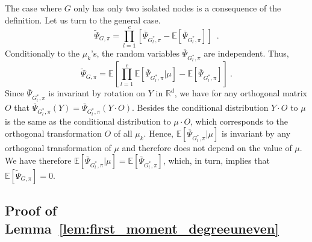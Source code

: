 \documentclass{article}
\begin{document}
    The case where $G$ only has only two isolated nodes is a consequence of the definition. Let us turn to the general case. 
    \[
    \widetilde{\Psi}_{G,\pi}= \prod_{l=1}^c \left[\overline{\Psi}_{G^*_l,\pi} - \mathbb{E}[\overline{\Psi}_{G^*_l,\pi} ]\right] \enspace . 
    \]
    Conditionally to the $\mu_k$'s, the random variables $\overline{\Psi}_{G^*_l,\pi}$ are independent. Thus, 
    \[
    \widetilde{\Psi}_{G,\pi}=\mathbb{E}\left[\prod_{l=1}^c \mathbb{E}[\overline{\Psi}_{G^*_l,\pi}|\mu] - \mathbb{E}[\overline{\Psi}_{G^*_l,\pi}] \right]\ . 
    \]
    Since $\overline{\Psi}_{G^*_l,\pi}$ is invariant by rotation on $Y$ in $\mathbb{R}^d$, we have for any orthogonal matrix $O$ that 
    $\overline{\Psi}_{G^*_l,\pi}(Y)= \overline{\Psi}_{G^*_l,\pi}(Y\cdot O)$. Besides the conditional distribution  $Y\cdot O$ to $\mu$ is the same as the conditional distribution to $\mu\cdot O$, which corresponds to the orthogonal transformation $O$ of all $\mu_k$. Hence,
    $\mathbb{E}[\overline{\Psi}_{G^*_l,\pi}|\mu]$ is invariant by any orthogonal transformation of $\mu$ and therefore does not depend on the value of $\mu$. We have therefore $\mathbb{E}[\overline{\Psi}_{G^*_l,\pi}|\mu]= \mathbb{E}[\overline{\Psi}_{G^*_l,\pi}]$, which, in turn, implies that $\mathbb{E}[\widetilde{\Psi}_{G,\pi}]=0$.  



    \subsection{Proof of Lemma~\ref{lem:first_moment_degreeuneven}}
\end{document}
